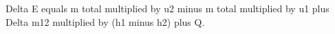 Delta E equals m total multiplied by u2 minus m total multiplied by u1 plus Delta m12 multiplied by (h1 minus h2) plus Q.